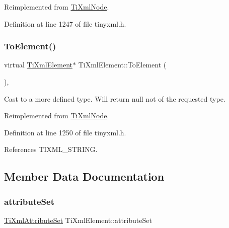 Reimplemented from \hyperlink{class_ti_xml_node_a4080428f2cac46e92ef4d284202fad0b}{Ti\+Xml\+Node}.



Definition at line 1247 of file tinyxml.\+h.

\hypertarget{class_ti_xml_element_a9def86337ea7a755eb41cac980f60c7a}{}\label{class_ti_xml_element_a9def86337ea7a755eb41cac980f60c7a} 
\subsubsection{\texorpdfstring{To\+Element()}{ToElement()}\hspace{0.1cm}{\footnotesize\ttfamily [2/2]}}
{\footnotesize\ttfamily virtual \hyperlink{class_ti_xml_element}{Ti\+Xml\+Element}$\ast$ Ti\+Xml\+Element\+::\+To\+Element (\begin{DoxyParamCaption}{ }\end{DoxyParamCaption})\hspace{0.3cm}{\ttfamily [inline]}, {\ttfamily [virtual]}}



Cast to a more defined type. Will return null not of the requested type. 



Reimplemented from \hyperlink{class_ti_xml_node_aa65d000223187d22a4dcebd7479e9ebc}{Ti\+Xml\+Node}.



Definition at line 1250 of file tinyxml.\+h.



References T\+I\+X\+M\+L\+\_\+\+S\+T\+R\+I\+NG.



\subsection{Member Data Documentation}
\hypertarget{class_ti_xml_element_a56d7e69380c3cc938bf213d2857791b2}{}\label{class_ti_xml_element_a56d7e69380c3cc938bf213d2857791b2} 
\subsubsection{\texorpdfstring{attribute\+Set}{attributeSet}}
{\footnotesize\ttfamily \hyperlink{class_ti_xml_attribute_set}{Ti\+Xml\+Attribute\+Set} Ti\+Xml\+Element\+::attribute\+Set\hspace{0.3cm}{\ttfamily [private]}}



